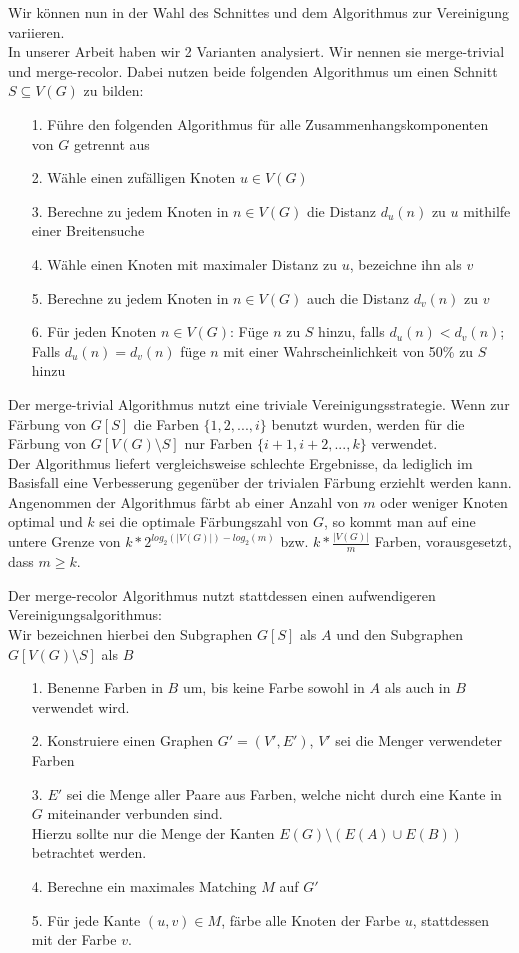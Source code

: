 \documentclass[11pt]{article}
\begin{document}
Wir können nun in der Wahl des Schnittes und dem Algorithmus zur Vereinigung variieren.\\
In unserer Arbeit haben wir 2 Varianten analysiert. Wir nennen sie merge-trivial und merge-recolor.
Dabei nutzen beide folgenden Algorithmus um einen Schnitt $S\subseteq V(G)$ zu bilden:
\begin{itemize}
\item[1.] Führe den folgenden Algorithmus für alle Zusammenhangskomponenten von $G$ getrennt aus
\item[2.] Wähle einen zufälligen Knoten $u\in V(G)$
\item[3.] Berechne zu jedem Knoten in $n\in V(G)$ die Distanz $d_u(n)$ zu $u$ mithilfe einer Breitensuche
\item[4.] Wähle einen Knoten mit maximaler Distanz zu $u$, bezeichne ihn als $v$
\item[5.] Berechne zu jedem Knoten in $n\in V(G)$ auch die Distanz $d_v(n)$ zu $v$
\item[6.] Für jeden Knoten $n\in V(G)$: Füge $n$ zu $S$ hinzu, falls $d_u(n)<d_v(n)$; Falls $d_u(n)=d_v(n)$ füge $n$ mit einer Wahrscheinlichkeit von 50\% zu $S$ hinzu
\end{itemize}

Der merge-trivial Algorithmus nutzt eine triviale Vereinigungsstrategie. 
Wenn zur Färbung von $G[S]$ die Farben $\{1,2,...,i\}$ benutzt wurden, 
werden für die Färbung von $G[V(G)\setminus S]$ nur Farben $\{i+1,i+2,...,k\}$ verwendet.\\

Der Algorithmus liefert vergleichsweise schlechte Ergebnisse, 
da lediglich im Basisfall eine Verbesserung gegenüber der trivialen Färbung erziehlt werden kann.
Angenommen der Algorithmus färbt ab einer Anzahl von $m$ oder weniger Knoten optimal
und $k$ sei die optimale Färbungszahl von $G$, so kommt man auf eine untere Grenze von 
$k*2^{log_2(|V(G)|)-log_2(m)}$ bzw. $k*\frac{|V(G)|}{m}$ Farben, vorausgesetzt, dass $m\geq k$.\par

Der merge-recolor Algorithmus nutzt stattdessen einen aufwendigeren Vereinigungsalgorithmus:\\
Wir bezeichnen hierbei den Subgraphen $G[S]$ als $A$ und den Subgraphen $G[V(G)\setminus S]$ als $B$
\begin{itemize}
\item[1.] Benenne Farben in $B$ um, bis keine Farbe sowohl in $A$ als auch in $B$ verwendet wird.
\item[2.] Konstruiere einen Graphen $G'=(V',E')$, $V'$ sei die Menger verwendeter Farben
\item[3.] $E'$ sei die Menge aller Paare aus Farben, welche nicht durch eine Kante in $G$ miteinander verbunden sind. \\Hierzu sollte nur die Menge der Kanten $E(G)\setminus (E(A)\cup E(B))$ betrachtet werden.
\item[4.] Berechne ein maximales Matching $M$ auf $G'$
\item[5.] Für jede Kante $(u,v)\in M$, färbe alle Knoten der Farbe $u$, stattdessen mit der Farbe $v$.
\end{itemize}
\end{document}
